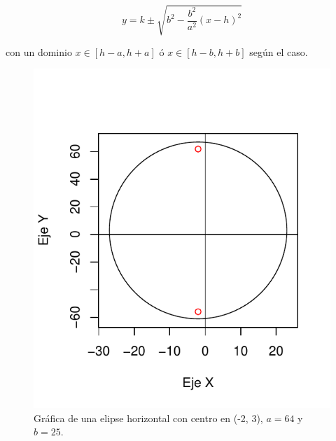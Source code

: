 \documentclass[12pt,a4paper]{report}
\begin{document}
\begin{equation}
y = k \pm \sqrt{b^2 - \frac{b^2}{a^2}(x - h)^2} \label{eq:elipsedes}
\end{equation}

con un dominio $x \in [h - a, h + a]$ ó $x \in [h - b, h + b]$ según el caso. 

\begin{figure}
\centering
\includegraphics[scale=0.9]{Elipse1}
\caption{Gráfica de una elipse horizontal con centro en (-2, 3), $a = 64$ y $b = 25$.}
\label{fig:Elipse1}
\end{figure}
\end{document}
